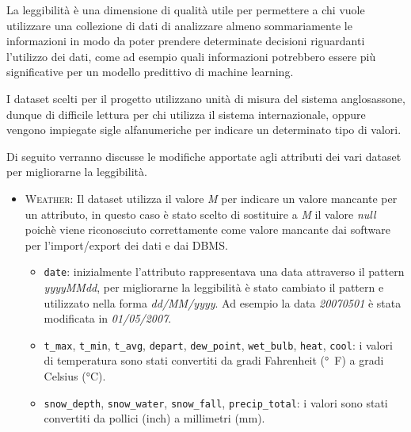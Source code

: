La leggibilità è una dimensione di qualità utile per permettere a chi vuole 
utilizzare una collezione di dati di analizzare almeno sommariamente le 
informazioni in modo da poter prendere determinate decisioni riguardanti 
l'utilizzo dei dati, come ad esempio quali informazioni potrebbero essere più 
significative per un modello predittivo di machine learning.

I dataset scelti per il progetto utilizzano unità di misura del sistema 
anglosassone, dunque di difficile lettura per chi utilizza il sistema 
internazionale, oppure vengono impiegate sigle alfanumeriche per indicare un 
determinato tipo di valori. 

Di seguito verranno discusse le modifiche apportate agli attributi dei vari 
dataset per migliorarne la leggibilità.

\begin{itemize}

    \item \textsc{Weather}: Il dataset utilizza il valore \textit{M} per 
        indicare un valore mancante per un attributo, in questo caso è stato 
        scelto di sostituire a \textit{M} il valore \textit{null} poichè viene 
        riconosciuto correttamente come valore mancante dai software per 
        l'import/export dei dati e dai DBMS.
        
        \begin{itemize}
            
            \item \texttt{date}: inizialmente l'attributo rappresentava una 
                data attraverso il pattern \textit{yyyyMMdd}, per migliorarne 
                la leggibilità è stato cambiato il pattern e utilizzato nella 
                forma \textit{dd/MM/yyyy}. Ad esempio la data 
                \textit{20070501} è stata modificata in \textit{01/05/2007}.
        
            \item \texttt{t\_max}, \texttt{t\_min},  \texttt{t\_avg}, \texttt{depart}, 
            	\texttt{dew\_point}, \texttt{wet\_bulb}, \texttt{heat}, 
            	\texttt{cool}: i valori di temperatura sono stati convertiti da 
            	gradi Fahrenheit (\si{\degree F}) a gradi Celsius 
            	(\si{\celsius}).

           	\item \texttt{snow\_depth}, \texttt{snow\_water}, \texttt{snow\_fall}, 
           		\texttt{precip\_total}: i valori sono stati convertiti da pollici
           		(inch) a millimetri (mm).


\end{itemize}
\end{itemize}
